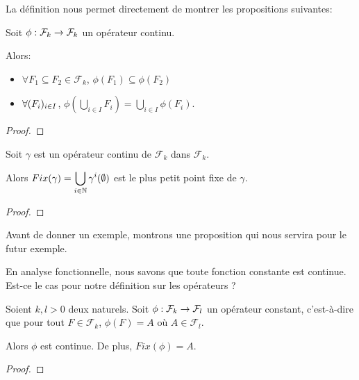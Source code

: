 La définition nous permet directement de montrer les propositions suivantes:

\begin{proposition}
	Soit $\phi : \mathcal{F}_{k} \rightarrow \mathcal{F}_{k}$ un opérateur
	continu.

	Alors:

	\begin{itemize}
		\item $\forall F_{1} \subseteq F_{2} \in {\mathcal{F}_{k}}$,
			$\phi(F_{1}) \subseteq \phi(F_{2})$
		\item $\forall (F_{i})_{i \in I}$, $\displaystyle \phi(\bigcup_{i \in I} F_{i}) =
			\bigcup_{i \in I} \phi(F_{i})$.
	\end{itemize}
\end{proposition}

\ifdefined\outputproof
\begin{proof}

\end{proof}
\fi

\begin{theorem}
	\label{theorem:plus_petit_point_fixe}
	Soit $\gamma$ est un opérateur continu de $\mathcal{F}_{k}$ dans
	$\mathcal{F}_{k}$.

	Alors $Fix(\gamma) = \displaystyle \bigcup_{i \in \mathbb{N}} \gamma^{i}(\emptyset)$ est le
	plus petit point fixe de $\gamma$.
\end{theorem}

\ifdefined\outputproof
\begin{proof}

\end{proof}
\fi

Avant de donner un exemple, montrons une proposition qui nous servira pour le
futur exemple.

En analyse fonctionnelle, nous savons que toute fonction constante est
continue. Est-ce le cas pour notre définition sur les opérateurs ?

\begin{proposition}
	Soient $k, l > 0$ deux naturels.
	Soit $\phi : \mathcal{F}_{k} \rightarrow \mathcal{F}_{l}$ un opérateur
	constant, c'est-à-dire que pour tout $F \in \mathcal{F}_{k}$, $\phi(F) = A$
	où $A \in \mathcal{F}_{l}$.

	Alors $\phi$ est continue. De plus, $Fix(\phi) = A$.
\end{proposition}

\ifdefined\outputproof
\begin{proof}

\end{proof}
\fi

